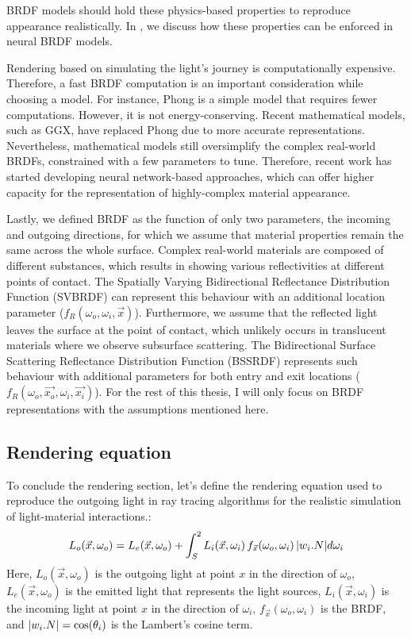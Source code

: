 BRDF models should hold these physics-based properties to reproduce appearance realistically. In \citeauthor{Chenliang's paper} \cite{Chenliang's paper}, we discuss how these properties can be enforced in neural BRDF models. 

Rendering based on simulating the light's journey is computationally expensive. Therefore, a fast BRDF computation is an important consideration while choosing a model. For instance, Phong is a simple model that requires fewer computations. However, it is not energy-conserving. Recent mathematical models, such as GGX, have replaced Phong due to more accurate representations. Nevertheless, mathematical models still oversimplify the complex real-world BRDFs, constrained with a few parameters to tune. Therefore, recent work has started developing neural network-based approaches, which can offer higher capacity for the representation of highly-complex material appearance.

Lastly, we defined BRDF as the function of only two parameters, the incoming and outgoing directions, for which we assume that material properties remain the same across the whole surface. Complex real-world materials are composed of different substances, which results in showing various reflectivities at different points of contact. The Spatially Varying Bidirectional Reflectance Distribution Function (SVBRDF) can represent this behaviour with an additional location parameter ($f_R(\omega_o, \omega_i,  \vec{x})$). Furthermore, we assume that the reflected light leaves the surface at the point of contact, which unlikely occurs in translucent materials where we observe subsurface scattering. The Bidirectional Surface Scattering Reflectance Distribution Function (BSSRDF) represents such behaviour with additional parameters for both entry and exit locations ($f_R(\omega_o, \vec{x_o}, \omega_i,  \vec{x_i})$). For the rest of this thesis, I will only focus on BRDF representations with the assumptions mentioned here.

\subsection{Rendering equation}

To conclude the rendering section, let's define the rendering equation used to reproduce the outgoing light in ray tracing algorithms for the realistic simulation of light-material interactions.:
\begin{equation}
L_o(\vec{x}, \omega_o) = L_e(\vec{x}, \omega_o)  +  \int_S^2 L_i(\vec{x}, \omega_i) \, f_{\vec{x}}(\omega_o,  \omega_i) \, \lvert w_i . N\rvert d\omega_i
\label{eqn:rendering-eqn}
\end{equation}
Here, $L_o(\vec{x}, \omega_o) $ is the outgoing light at point $x$ in the direction of $\omega_o$, $L_e(\vec{x}, \omega_o)$ is the emitted light that represents the light sources, $L_i(\vec{x}, \omega_i) $ is the incoming light at point $x$ in the direction of $\omega_i$, $f_{\vec{x}}(\omega_o,  \omega_i)$ is the BRDF, and $\lvert w_i . N\rvert = \cos(\theta_i)$ is the Lambert's cosine term.

